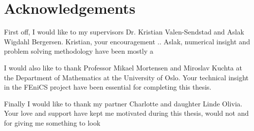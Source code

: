 \section*{Acknowledgements}
First off, I would like to my supervisors Dr. Kristian Valen-Sendstad and Aslak Wigdahl Bergersen. Kristian, your encouragement .. Aslak, numerical insight and problem solving methodology have been mostly a

I would also like to thank Professor Mikael Mortensen and Miroslav Kuchta at the Department of Mathematics at the University of Oslo. Your technical insight in the FEniCS project have been essential for completing this thesis. 

Finally I would like to thank my partner Charlotte and daughter Linde Olivia. Your love and support have kept me motivated during this thesis, would not and for giving me something to look
